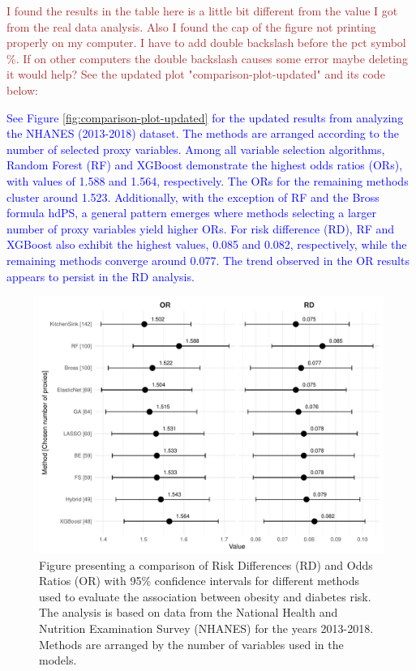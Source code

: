 \documentclass[sn-vancouver,Numbered,lineno,pdflatex]{sn-jnl}
\begin{document}
\textcolor{brown}{I found the results in the table here is a little bit different from the value I got from the real data analysis. Also I found the cap of the figure not printing properly on my computer. I have to add double backslash before the pct symbol \%. If on other computers the double backslash causes some error maybe deleting it would help? See the updated plot "comparison-plot-updated" and its code below:}

\textcolor{blue}{See Figure \ref{fig:comparison-plot-updated} for the updated results from analyzing the NHANES (2013-2018) dataset. The methods are arranged according to the number of selected proxy variables. Among all variable selection algorithms, Random Forest (RF) and XGBoost demonstrate the highest odds ratios (ORs), with values of 1.588 and 1.564, respectively. The ORs for the remaining methods cluster around 1.523. Additionally, with the exception of RF and the Bross formula hdPS, a general pattern emerges where methods selecting a larger number of proxy variables yield higher ORs. For risk difference (RD), RF and XGBoost also exhibit the highest values, 0.085 and 0.082, respectively, while the remaining methods converge around 0.077. The trend observed in the OR results appears to persist in the RD analysis.}

\begin{figure}[th]

{\centering \includegraphics[width=1\linewidth,]{manuscript_files/figure-latex/unnamed-chunk-4-1} 

}

\caption{Figure presenting a comparison of Risk Differences (RD) and Odds Ratios (OR) with 95\% confidence intervals for different methods used to evaluate the association between obesity and diabetes risk. The analysis is based on data from the National Health and Nutrition Examination Survey (NHANES) for the years 2013-2018. Methods are arranged by the number of variables used in the models.\label{fig:comparison-plot-updated}}\label{fig:unnamed-chunk-4}
\end{figure}
\end{document}
